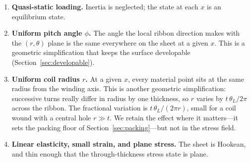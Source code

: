 \documentclass[11pt]{article}
\begin{document}
\begin{enumerate}
\item \textbf{Quasi-static loading.} Inertia is neglected; the state at each $x$
  is an equilibrium state. 

\item \textbf{Uniform pitch angle $\phi$.} The angle the local ribbon direction
  makes with the $(r,\theta)$ plane is the same everywhere on the sheet at a
  given $x$. This is a geometric simplification that keeps the surface developable (Section~\ref{sec:developable}).

\item \textbf{Uniform coil radius $r$.} At a given $x$, every material point sits
  at the same radius from the winding axis. This is another geometric simplification: successive turns really differ in radius by one thickness, so $r$ varies by $t\,\theta_L/2\pi$ across the ribbon. The fractional variation is $t\,\theta_L/(2\pi r)$, small for a coil wound with a central hole $r \gg t$. We retain the effect where it matters---it sets the packing floor of Section~\ref{sec:packing}---but not in the stress field.

\item \textbf{Linear elasticity, small strain, and plane stress.} The sheet is
  Hookean, and thin enough that the through-thickness stress state is plane.


\end{enumerate}
\end{document}
